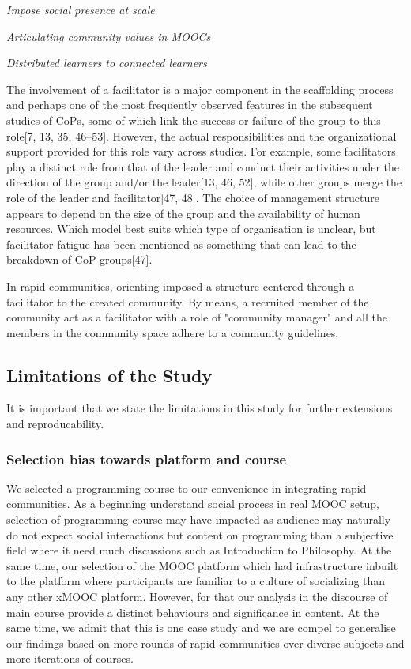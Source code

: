 \documentclass[manuscript,screen,review]{acmart}
\begin{document}
\textit{Impose social presence at scale} 

\textit{Articulating community values in MOOCs} 

\textit{Distributed learners to connected learners} 

The involvement of a facilitator is a major component in the scaffolding process and perhaps one of the most frequently observed features in the subsequent studies of CoPs, some of which link the success or failure of the group to this role[7, 13, 35, 46–53].  However, the actual responsibilities and the organizational support provided for this role vary across studies. For example, some facilitators play a distinct role from that of the leader and conduct their activities under the direction of the group and/or the leader[13, 46, 52], while other groups merge the role of the leader and facilitator[47, 48]. The choice of management structure appears to depend on the size of the group and the availability of human resources. Which model best suits which type of organisation is unclear, but facilitator fatigue has been mentioned as something that can lead to the breakdown of CoP groups[47].

In rapid communities, orienting imposed a structure centered through a facilitator to the created community. By means, a recruited member of the community act as a facilitator with a role of "community manager" and all the members in the community space adhere to a community guidelines. 

\subsection{Limitations of the Study}
It is important that we state the limitations in this study for further extensions and reproducability.  
\subsubsection{Selection bias towards platform and course} 
We selected a programming course to our convenience in integrating rapid communities. As a  beginning understand social process in real MOOC setup, selection of programming course may  have impacted as audience may naturally do not expect social interactions but content on programming than a subjective field where it need much discussions such as Introduction to Philosophy. At the same time, our selection of the MOOC platform which had infrastructure inbuilt to the platform where participants are familiar to a culture of  socializing than any other xMOOC platform. However, for that our analysis in the discourse of main course provide a distinct behaviours and significance in content. At the same time, we admit that this is one case study and we are compel to generalise our findings based on more rounds of rapid communities over diverse subjects and more iterations of courses. 
\end{document}
